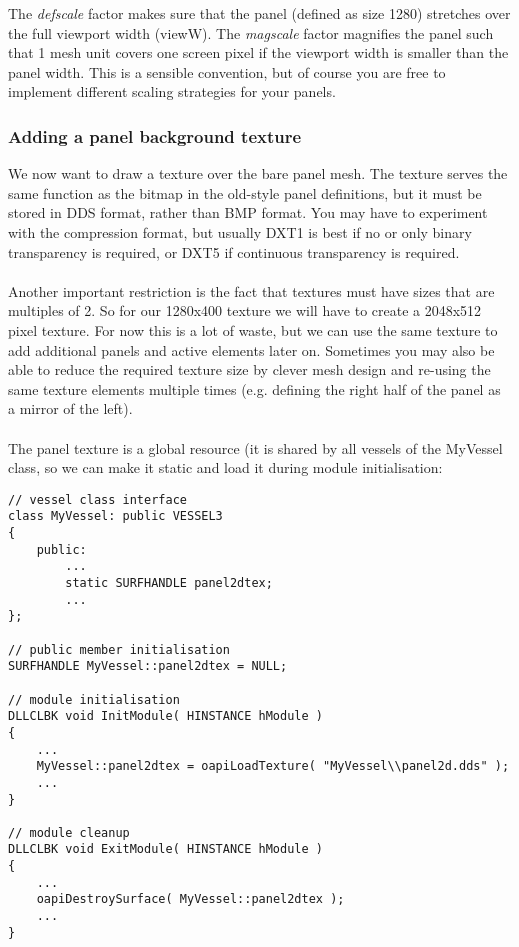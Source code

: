 \documentclass[Orbiter Developer Manual.tex]{subfiles}
\begin{document}
\noindent
The \textit{defscale} factor makes sure that the panel (defined as size 1280) stretches over the full viewport width (viewW). The \textit{magscale} factor magnifies the panel such that 1 mesh unit covers one screen pixel if the viewport width is smaller than the panel width. This is a sensible convention, but of course you are free to implement different scaling strategies for your panels.


\subsubsection{Adding a panel background texture}
We now want to draw a texture over the bare panel mesh. The texture serves the same function as the bitmap in the old-style panel definitions, but it must be stored in DDS format, rather than BMP format. You may have to experiment with the compression format, but usually DXT1 is best if no or only binary transparency is required, or DXT5 if continuous transparency is required.\\
\\
Another important restriction is the fact that textures must have sizes that are multiples of 2. So for our 1280x400 texture we will have to create a 2048x512 pixel texture. For now this is a lot of waste, but we can use the same texture to add additional panels and active elements later on. Sometimes you may also be able to reduce the required texture size by clever mesh design and re-using the same texture elements multiple times (e.g. defining the right half of the panel as a mirror of the left).\\
\\
The panel texture is a global resource (it is shared by all vessels of the MyVessel class, so we can make it static and load it during module initialisation:

\begin{lstlisting}
// vessel class interface
class MyVessel: public VESSEL3
{
	public:
		...
		static SURFHANDLE panel2dtex;
		...
};

// public member initialisation
SURFHANDLE MyVessel::panel2dtex = NULL;

// module initialisation
DLLCLBK void InitModule( HINSTANCE hModule )
{
	...
	MyVessel::panel2dtex = oapiLoadTexture( "MyVessel\\panel2d.dds" );
	...
}

// module cleanup
DLLCLBK void ExitModule( HINSTANCE hModule )
{
	...
	oapiDestroySurface( MyVessel::panel2dtex );
	...
}
\end{lstlisting}
\end{document}
